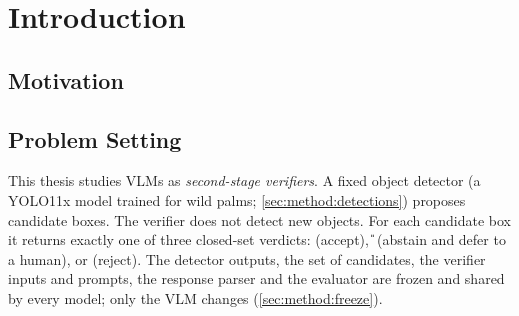 \section{Introduction}
\label{sec:intro}

\subsection{Motivation}


\subsection{Problem Setting}
This thesis studies VLMs as \emph{second-stage verifiers}. A fixed object
detector (a YOLO11x model trained for wild palms; \cref{sec:method:detections})
proposes candidate boxes. The verifier does not detect new objects. For each
candidate box it returns exactly one of three closed-set verdicts:
\R{} (accept), \U{} (abstain and defer to a human), or \Ur{} (reject). The
detector outputs, the set of candidates, the verifier inputs and prompts, the
response parser and the evaluator are frozen and shared by every model; only
the VLM changes (\cref{sec:method:freeze}).

